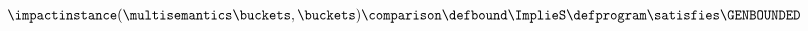 \begin{align*}
  \impactinstance(\multisemantics\buckets, \buckets) \comparison \defbound \ImplieS \defprogram \satisfies \GENBOUNDED
\end{align*}
